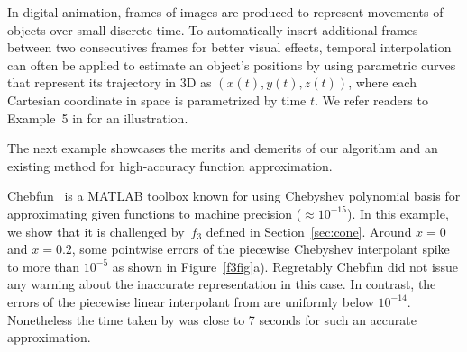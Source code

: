 In digital animation, frames of images are produced to represent movements of
objects over small discrete time. To automatically insert additional frames between 
two consecutives frames for better visual effects, temporal
interpolation can often be applied to estimate an object's positions by using
parametric curves that represent its trajectory in 3D as $(x(t), y(t), z(t))$,
where each Cartesian coordinate in space is parametrized by time $t$. We refer
readers to Example~5 in \cite[Section 3.6]{Din15a} for an illustration.


The next example showcases the merits and demerits of our algorithm and an
existing method for high-accuracy function approximation.

\begin{exmp}
Chebfun~\cite{TrefEtal15a} is a MATLAB toolbox known for using Chebyshev
polynomial basis for approximating given functions to machine precision
($\approx 10^{-15}$). In this example, we show that it is challenged by~$f_3$
defined in Section~\ref{sec:cone}. Around $x=0$ and $x=0.2$, some pointwise
errors of the piecewise Chebyshev interpolant spike to more than $10^{-5}$ as
shown in Figure~\ref{f3fig}a). Regretably Chebfun did not issue any warning
about the inaccurate representation in this case. In contrast, the errors of the
piecewise linear interpolant from \funappxg{} are uniformly below $10^{-14}$.
Nonetheless the time taken by \funappxg{} was close to 7 seconds for such an 
accurate approximation.


\end{exmp}
